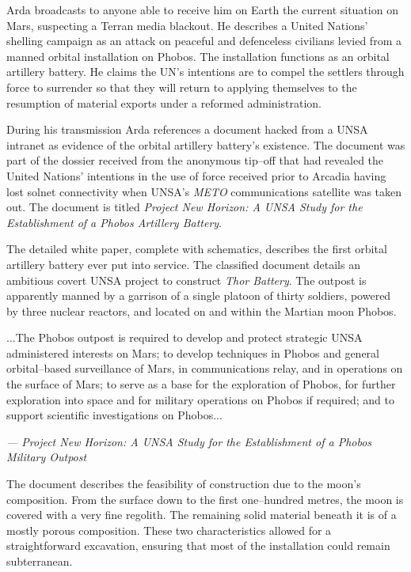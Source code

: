 Arda broadcasts to anyone able to receive him on Earth the current situation on Mars, suspecting a Terran media blackout. He describes a United Nations' shelling campaign as an attack on peaceful and defenceless civilians levied from a manned orbital installation on Phobos. The installation functions as an orbital artillery battery. He claims the UN's intentions are to compel the settlers through force to surrender so that they will return to applying themselves to the resumption of material exports under a reformed administration.

During his transmission Arda references a document hacked from a UNSA intranet as evidence of the orbital artillery battery's existence. The document was part of the dossier received from the anonymous tip--off that had revealed the United Nations' intentions in the use of force received prior to Arcadia having lost solnet connectivity when UNSA's {\it METO} communications satellite was taken out. The document is titled {\it Project New Horizon: A UNSA Study for the Establishment of a Phobos Artillery Battery}.

The detailed white paper, complete with schematics, describes the first orbital artillery battery ever put into service. The classified document details an ambitious covert UNSA project to construct {\it Thor Battery}. The outpost is apparently manned by a garrison of a single platoon of thirty soldiers, powered by three nuclear reactors, and located on and within the Martian moon Phobos. 

\startTimelineGeneralDocument
...The Phobos outpost is required to develop and protect strategic UNSA administered interests on Mars; to develop techniques in Phobos and general orbital--based surveillance of Mars, in communications relay, and in operations on the surface of Mars; to serve as a base for the exploration of Phobos, for further exploration into space and for military operations on Phobos if required; and to support scientific investigations on Phobos...

\hskip 1.5cm {\it --- Project New Horizon: A UNSA Study for the Establishment of a Phobos Military Outpost}
\stopTimelineGeneralDocument

The document describes the feasibility of construction due to the moon's composition. From the surface down to the first one--hundred metres, the moon is covered with a very fine regolith. The remaining solid material beneath it is of a mostly porous composition. These two characteristics allowed for a straightforward excavation, ensuring that most of the installation could remain subterranean.

